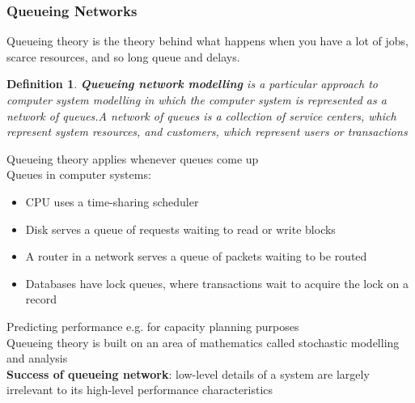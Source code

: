 \documentclass[10pt, oneside]{article}
\newtheorem{defn}{Definition}
\begin{document}
\subsubsection{Queueing Networks}
Queueing theory is the theory behind what happens when you have a lot of jobs, scarce resources, and so long queue and delays.
\begin{defn}
    {\bf Queueing network modelling} is a particular approach to computer system modelling in which the computer system is represented as a network of queues.A network of queues is a collection of service centers, which represent system resources, and customers, which represent users or transactions
\end{defn}Queueing theory applies whenever queues come up\\
Queues in computer systems:\begin{itemize}
    \item CPU uses a time-sharing scheduler
    \item Disk serves a queue of requests waiting to read or write blocks
    \item A router in a network serves a queue of packets waiting to be routed
    \item Databases have lock queues, where transactions wait to acquire the lock
    on a record
\end{itemize}Predicting performance e.g. for capacity planning purposes\\
Queueing theory is built on an area of mathematics called stochastic modelling and analysis\\{\bf Success of queueing network}: low-level details of a system are largely irrelevant to its high-level performance characteristics
\end{document}
